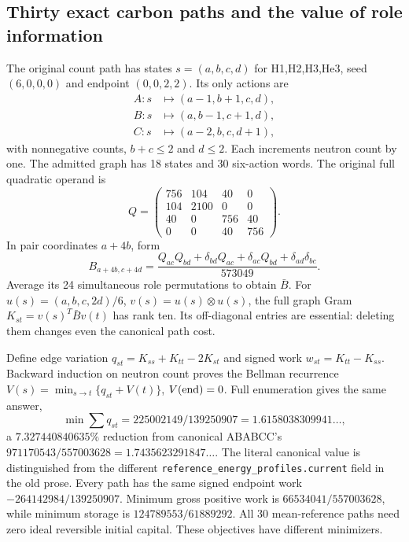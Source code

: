 \subsection{Thirty exact carbon paths and the value of role information}
\label{sec:c12-paths-12}

The original count path has states $s=(a,b,c,d)$ for H1,H2,H3,He3,
seed $(6,0,0,0)$ and endpoint $(0,0,2,2)$. Its only actions are
\begin{align*}
 A:s&\mapsto(a-1,b+1,c,d),\\
 B:s&\mapsto(a,b-1,c+1,d),\\
 C:s&\mapsto(a-2,b,c,d+1),
\end{align*}
with nonnegative counts, $b+c\le2$ and $d\le2$. Each increments neutron
count by one. The admitted graph has 18 states and 30 six-action words.
The original full quadratic operand is
\begin{equation}
 Q=\begin{pmatrix}756&104&40&0\\104&2100&0&0\\
 40&0&756&40\\0&0&40&756\end{pmatrix}.
\end{equation}
In pair coordinates $a+4b$, form
\begin{equation}
 B_{a+4b,c+4d}=
 \frac{Q_{ac}Q_{bd}+\delta_{bd}Q_{ac}+\delta_{ac}Q_{bd}
                         +\delta_{ad}\delta_{bc}}{573049}.
\end{equation}
Average its 24 simultaneous role permutations to obtain $\bar B$.
For $u(s)=(a,b,c,2d)/6$, $v(s)=u(s)\otimes u(s)$, the full graph Gram
$K_{st}=v(s)^T\bar Bv(t)$ has rank ten. Its off-diagonal entries are
essential: deleting them changes even the canonical path cost.

Define edge variation $q_{st}=K_{ss}+K_{tt}-2K_{st}$ and signed work
$w_{st}=K_{tt}-K_{ss}$. Backward induction on neutron count proves the
Bellman recurrence $V(s)=\min_{s\to t}\{q_{st}+V(t)\}$, $V({\rm end})=0$.
Full enumeration gives the same answer,
\begin{equation}
 \min\sum q_{st}=225002149/139250907=1.6158038309941\ldots,
\end{equation}
a $7.327440840635\%$ reduction from canonical ABABCC's
$971170543/557003628=1.7435623291847\ldots$.
The literal canonical value is distinguished from the different
\texttt{reference\_energy\_profiles.current} field in the old prose.
Every path has the same signed endpoint work
$-264142984/139250907$. Minimum gross positive work is
$66534041/557003628$, while minimum storage is
$124789553/61889292$. All 30 mean-reference paths need zero ideal
reversible initial capital. These objectives have different minimizers.

